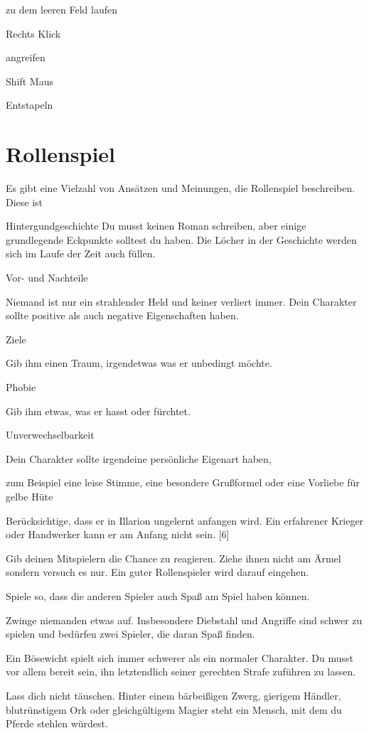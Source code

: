 \documentclass[a4paper,11pt]{book}
\begin{document}
zu dem leeren Feld laufen

Rechts Klick

angreifen

Shift Maus

Entstapeln

\chapter{Rollenspiel}

Es gibt eine Vielzahl von Ansätzen und Meinungen, die Rollenspiel beschreiben. Diese ist

Hintergundgeschichte  Du musst keinen Roman schreiben, aber einige grundlegende Eckpunkte solltest du haben. Die Löcher in der Geschichte werden sich im Laufe der Zeit auch füllen.

Vor- und Nachteile

Niemand ist nur ein strahlender Held und keiner verliert immer. Dein Charakter sollte positive als auch negative Eigenschaften haben.

Ziele

Gib ihm einen Traum, irgendetwas was er unbedingt möchte.

Phobie

Gib ihm etwas, was er hasst oder fürchtet.

Unverwechselbarkeit

Dein Charakter sollte irgendeine persönliche Eigenart haben,

zum Beispiel eine leise Stimme, eine besondere Grußformel oder eine Vorliebe für gelbe Hüte

Berücksichtige, dass er in Illarion ungelernt anfangen wird. Ein erfahrener Krieger oder Handwerker kann er am Anfang nicht sein. [6]

Gib deinen Mitspielern die Chance zu reagieren. Ziehe ihnen nicht am Ärmel sondern versuch es nur. Ein guter Rollenspieler wird darauf eingehen.

Spiele so, dass die anderen Spieler auch Spaß am Spiel haben können.

Zwinge niemanden etwas auf. Insbesondere Diebstahl und Angriffe sind schwer zu spielen und bedürfen zwei Spieler, die daran Spaß finden.

Ein Bösewicht spielt sich immer schwerer als ein normaler Charakter. Du musst vor allem bereit sein, ihn letztendlich seiner gerechten Strafe zuführen zu lassen.

Lass dich nicht täuschen. Hinter einem bärbeißigen Zwerg, gierigem Händler, blutrünstigem Ork oder gleichgültigem Magier steht ein Mensch, mit dem du Pferde stehlen würdest.
\end{document}
